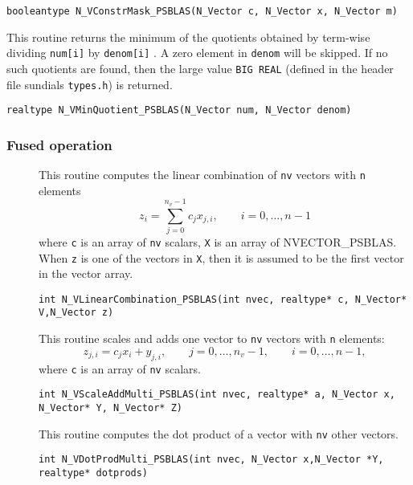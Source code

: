 \documentclass[twoside,a4paper]{refart}
\begin{document}
\begin{description}
 	 \lstinline[style=CStyle]|booleantype N_VConstrMask_PSBLAS(N_Vector c, N_Vector x, N_Vector m)|
 	 
 	\item[\fbox{\texttt{N\_VMinQuotient\_PSBLAS}}] This routine returns the minimum of the quotients obtained by term-wise
 	dividing \lstinline[style=CStyle]|num[i]| by \lstinline[style=CStyle]|denom[i]| . A zero element in \lstinline[style=CStyle]|denom| will be skipped. If no
 	such quotients are found, then the large value \lstinline[style=CStyle]|BIG REAL| (defined in the
 	header file sundials \texttt{types.h}) is returned.
 	
 	 \lstinline[style=CStyle]|realtype N_VMinQuotient_PSBLAS(N_Vector num, N_Vector denom)|
 	
\end{description}

\subsubsection{Fused operation}
\begin{description}
 	\item[] This routine computes the linear combination of \lstinline[style=CStyle]|nv| vectors with \lstinline[style=CStyle]|n| elements
 	\begin{equation*}
 		z_i = \sum_{j=0}^{n_v - 1} c_j x_{j,i}, \qquad i=0,\ldots,n-1
 	\end{equation*}
 	where \lstinline[style=CStyle]|c| is an array of \lstinline[style=CStyle]|nv| scalars, \lstinline[style=CStyle]|X| is an array of NVECTOR\_PSBLAS. When \lstinline[style=CStyle]|z| is one of the vectors in \lstinline[style=CStyle]|X|, then it is assumed to be the first vector in the vector array.
 	
 	 \lstinline[style=CStyle]|int N_VLinearCombination_PSBLAS(int nvec, realtype* c, N_Vector* V,N_Vector z)|
 	
 	\item[] This routine scales and adds one vector to \lstinline[style=CStyle]|nv| vectors with \lstinline[style=CStyle]|n| elements:
 	\begin{equation*}
 		z_{j,i} = c_j x_i + y_{j,i}, \qquad j=0,\ldots,n_v-1, \qquad i=0,\ldots,n-1,
 	\end{equation*}
 	where \lstinline[style=CStyle]|c| is an array of \lstinline[style=CStyle]|nv| scalars.
 	
 	 \lstinline[style=CStyle]|int N_VScaleAddMulti_PSBLAS(int nvec, realtype* a, N_Vector x, N_Vector* Y, N_Vector* Z)|
 	
 	\item[] This routine computes the dot product of a vector with \lstinline[style=CStyle]|nv| other vectors.
 	
 	 \lstinline[style=CStyle]|int N_VDotProdMulti_PSBLAS(int nvec, N_Vector x,N_Vector *Y, realtype* dotprods)|
 \end{description}
\end{document}

